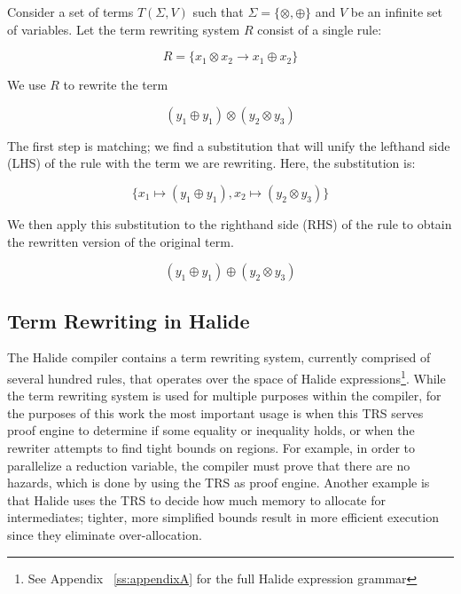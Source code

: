 \documentclass[sigplan,review,anonymous]{acmart}\settopmatter{printfolios=true,printccs=false,printacmref=false}
\newcommand{\jln}[1]{\textcolor{uwpurple}{\textit{[{#1} --JLN]}}}
\begin{document}
Consider a set of terms $T(\Sigma, V)$ such that $\Sigma = \{\otimes, \oplus\}$ and $V$ be an infinite set of variables. Let the term rewriting system $R$ consist of a single rule:

\[ R = \{ x_1 \otimes x_2 \rightarrow x_1 \oplus x_2 \} \]

We use $R$ to rewrite the term

\[ 
(y_1 \oplus y_1) \otimes (y_2 \otimes y_3)
\]

The first step is matching; we find a substitution that will unify the lefthand side (LHS) of the rule with the term we are rewriting. Here, the substitution is:

\[
\{ x_1 \mapsto (y_1 \oplus y_1), x_2 \mapsto (y_2 \otimes y_3) \}
\]

We then apply this substitution to the righthand side (RHS) of the rule to obtain the rewritten version of the original term.

\[ 
(y_1 \oplus y_1) \oplus (y_2 \otimes y_3)
\]

\subsection{Term Rewriting in Halide}

The Halide compiler contains a term rewriting system, currently comprised of
several hundred rules, that operates over the space of Halide
expressions\footnote{See Appendix ~\ref{ss:appendixA} for the full Halide
  expression grammar}. While the term rewriting system is used for multiple
purposes within the compiler, for the purposes of this work the most important
usage is when this TRS serves proof engine to determine if
some equality or inequality holds, or when the rewriter attempts to find tight
bounds on regions. For example, in order to parallelize a
reduction variable, the compiler must prove that there are no hazards, which is
done by using the TRS as proof engine.  Another example is that Halide uses
the TRS to decide how much memory to allocate for intermediates; tighter, more
simplified bounds result in more efficient execution since they eliminate over-allocation.

\end{document}
